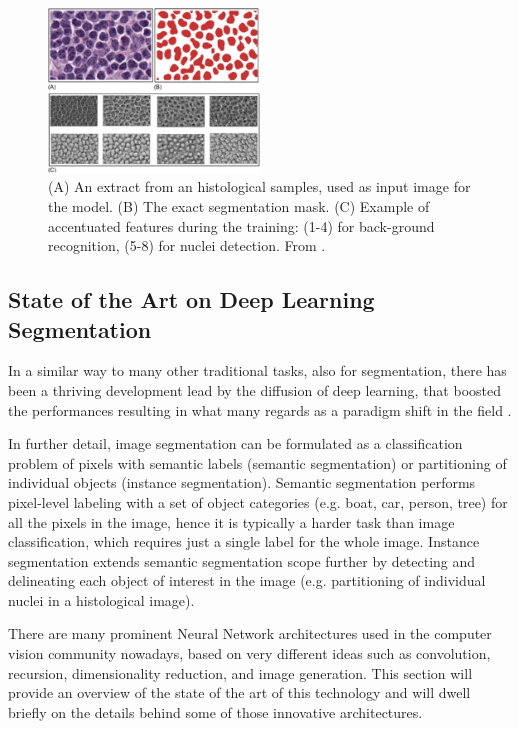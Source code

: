 \begin{figure}
    \centering
    \includegraphics[width = 0.5\textwidth]{images/nuclei_feature}
    \caption{(A) An extract from an histological samples, used as input image for the model. (B) The exact segmentation mask. (C)
    Example of accentuated features during the training: (1-4) for back-ground recognition, (5-8) for nuclei detection. From \cite{alheejawi2020deep}.}
    \label{fig:nuclei_feature}
\end{figure}

\subsection{State of the Art on Deep Learning Segmentation} \label{ssec:soa_seg}
In a similar way to many other traditional tasks, also for segmentation, there has been a thriving development lead by the diffusion of deep learning, that boosted the performances resulting in what many regards as a paradigm shift in the field \cite{deep_seg_SOA}.

In further detail, image segmentation can be formulated as a classification problem of pixels with semantic labels (semantic segmentation) or partitioning of individual objects (instance segmentation). Semantic segmentation performs pixel-level labeling with a set of object categories (e.g. boat, car, person, tree) for all the pixels in the image, hence it is typically a harder task than image classification, which requires just a single label for the whole image. Instance segmentation extends semantic segmentation scope further by detecting and delineating each object of interest in the image (e.g. partitioning of individual nuclei in a histological image).

There are many prominent Neural Network architectures used in the computer vision community nowadays, based on very different ideas such as convolution, recursion, dimensionality reduction, and image generation. This section will provide an overview of the state of the art of this technology and will dwell briefly on the details behind some of those innovative architectures.

